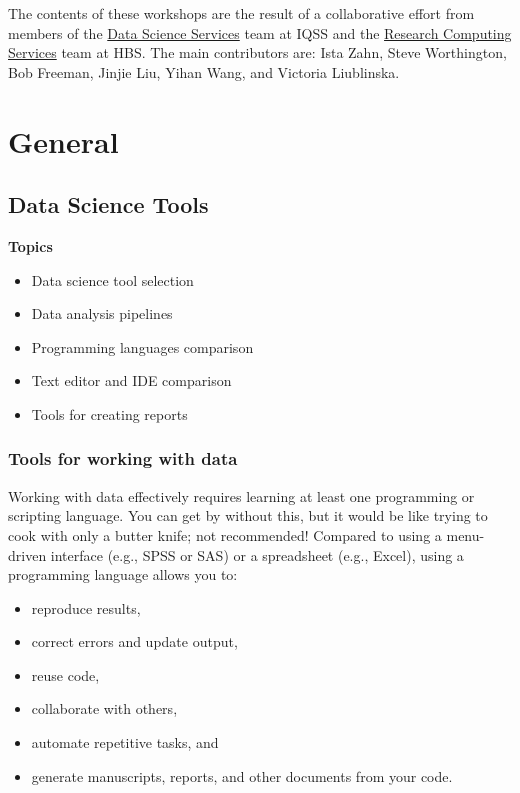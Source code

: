 \documentclass[]{book}
\providecommand{\tightlist}{%
  \setlength{\itemsep}{0pt}\setlength{\parskip}{0pt}}
\begin{document}
The contents of these workshops are the result of a collaborative effort
from members of the \href{http://dss.iq.harvard.edu}{Data Science
Services} team at IQSS and the
\href{https://training.rcs.hbs.org}{Research Computing Services} team at
HBS. The main contributors are: Ista Zahn, Steve Worthington, Bob
Freeman, Jinjie Liu, Yihan Wang, and Victoria Liublinska.

\part{General}\label{part-general}

\chapter{Data Science Tools}\label{data-science-tools}

\textbf{Topics}

\begin{itemize}
\tightlist
\item
  Data science tool selection
\item
  Data analysis pipelines
\item
  Programming languages comparison
\item
  Text editor and IDE comparison
\item
  Tools for creating reports
\end{itemize}

\section{Tools for working with data}\label{tools-for-working-with-data}

Working with data effectively requires learning at least one programming
or scripting language. You can get by without this, but it would be like
trying to cook with only a butter knife; not recommended! Compared to
using a menu-driven interface (e.g., SPSS or SAS) or a spreadsheet
(e.g., Excel), using a programming language allows you to:

\begin{itemize}
\tightlist
\item
  reproduce results,
\item
  correct errors and update output,
\item
  reuse code,
\item
  collaborate with others,
\item
  automate repetitive tasks, and
\item
  generate manuscripts, reports, and other documents from your code.
\end{itemize}
\end{document}
